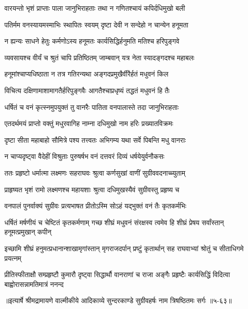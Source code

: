 \twolineshloka
{वारयन्तो भृशं प्राप्ताः पाला जानुभिराहताः}
{तथा न गणितश्चायं कपिर्दधिमुखो बली} %

\twolineshloka
{पतिर्मम वनस्यायमस्माभिः स्थापितः स्वयम्}
{दृष्टा देवी न सन्देहो न चान्येन हनूमता} %

\twolineshloka
{न ह्यन्यः साधने हेतुः कर्मणोऽस्य हनूमतः}
{कार्यसिद्धिर्हनुमति मतिश्च हरिपुङ्गवे} %

\twolineshloka
{व्यवसायश्च वीर्यं च श्रुतं चापि प्रतिष्ठितम्}
{जाम्बवान् यत्र नेता स्यादङ्गदश्च महाबलः} %

\twolineshloka
{हनूमांश्चाप्यधिष्ठाता न तत्र गतिरन्यथा}
{अङ्गदप्रमुखैर्वीरैर्हतं मधुवनं किल} %

\twolineshloka
{विचित्य दक्षिणामाशामागतैर्हरिपुङ्गवैः}
{आगतैश्चाप्रधृष्यं तद्धतं मधुवनं हि तैः} %

\twolineshloka
{धर्षितं च वनं कृत्स्नमुपयुक्तं तु वानरैः}
{पातिता वनपालास्ते तदा जानुभिराहताः} %

\twolineshloka
{एतदर्थमयं प्राप्तो वक्तुं मधुरवागिह}
{नाम्ना दधिमुखो नाम हरिः प्रख्यातविक्रमः} %

\twolineshloka
{दृष्टा सीता महाबाहो सौमित्रे पश्य तत्त्वतः}
{अभिगम्य यथा सर्वे पिबन्ति मधु वानराः} %

\twolineshloka
{न चाप्यदृष्ट्वा वैदेहीं विश्रुताः पुरुषर्षभ}
{वनं दत्तवरं दिव्यं धर्षयेयुर्वनौकसः} %

\twolineshloka
{ततः प्रहृष्टो धर्मात्मा लक्ष्मणः सहराघवः}
{श्रुत्वा कर्णसुखां वाणीं सुग्रीववदनाच्च्युताम्} %

\twolineshloka
{प्राहृष्यत भृशं रामो लक्ष्मणश्च महायशाः}
{श्रुत्वा दधिमुखस्यैवं सुग्रीवस्तु प्रहृष्य च} %

\twolineshloka
{वनपालं पुनर्वाक्यं सुग्रीवः प्रत्यभाषत}
{प्रीतोऽस्मि सोऽहं यद्भुक्तं वनं तैः कृतकर्मभिः} %

\threelineshloka
{धर्षितं मर्षणीयं च चेष्टितं कृतकर्मणाम्}
{गच्छ शीघ्रं मधुवनं संरक्षस्व त्वमेव हि}
{शीघ्रं प्रेषय सर्वांस्तान् हनूमत्प्रमुखान् कपीन्} %

\twolineshloka
{इच्छामि शीघ्रं हनुमत्प्रधानान्शाखामृगांस्तान् मृगराजदर्पान्}
{प्रष्टुं कृतार्थान् सह राघवाभ्यां श्रोतुं च सीताधिगमे प्रयत्नम्} %

\twolineshloka
{प्रीतिस्फीताक्षौ सम्प्रहृष्टौ कुमारौ दृष्ट्वा सिद्धार्थौ वानराणां च राजा}
{अङ्गैः प्रहृष्टैः कार्यसिद्धिं विदित्वा बाह्वोरासन्नामतिमात्रं ननन्द} %


॥इत्यार्षे श्रीमद्रामायणे वाल्मीकीये आदिकाव्ये सुन्दरकाण्डे सुग्रीवहर्षः नाम त्रिषष्ठितमः सर्गः ॥५-६३॥
